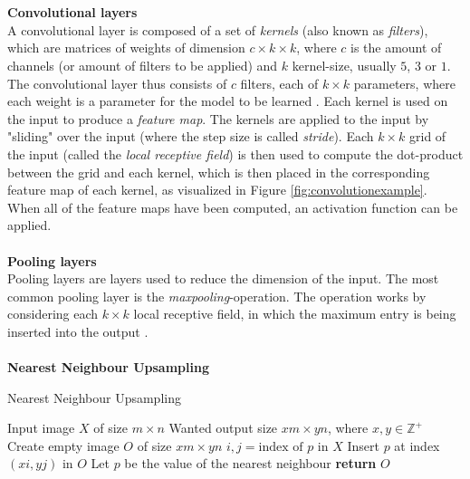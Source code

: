 \documentclass[./main.tex]{subfiles}
\begin{document}
\\
\\
\textbf{Convolutional layers} \\
A convolutional layer is composed of a set of \textit{kernels} (also known as \textit{filters}), which are matrices of weights of dimension $c \times k \times k$, where $c$ is the amount of channels (or amount of filters to be applied) and $k$ kernel-size, usually $5$, $3$ or $1$. The convolutional layer thus consists of $c$ filters, each of $k \times k$ parameters, where each weight is a parameter for the model to be learned \cite{Everything}. Each kernel is used on the input to produce a \textit{feature map}. The kernels are applied to the input by "sliding" over the input (where the step size is called \textit{stride}). Each $k \times k$ grid of the input (called the \textit{local receptive field}) is then used to compute the dot-product between the grid and each kernel, which is then placed in the corresponding feature map of each kernel, as visualized in Figure \ref{fig:convolutionexample}. When all of the feature maps have been computed, an activation function can be applied.
\\
\\
\textbf{Pooling layers}\\
Pooling layers are layers used to reduce the dimension of the input. The most common pooling layer is the \textit{maxpooling}-operation. The operation works by considering each $k \times k$ local receptive field, in which the maximum entry is being inserted into the output \cite{CNN}.
\\
\\
\noindent \textbf{Nearest Neighbour Upsampling}
\begin{algorithm}[htbp]
    \caption{Nearest Neighbour Upsampling \cite{NNUpsampling}}
    \label{Algorithm:NNUpsampling}
    \begin{algorithmic}[1]
        \Require Input image $X$ of size $m \times n$
        \Require Wanted output size $xm \times yn$, where $x, y \in \mathbb{Z}^{+}$
        \State Create empty image $O$ of size $xm \times yn$
            \State $i,j = \text{index of } p \text{ in } X$
            \State Insert $p$ at index $(xi, yj)$ in $O$
        \EndFor
            \State Let $p$ be the value of the nearest neighbour
        \EndFor
        \State \textbf{return} $O$
    \end{algorithmic}
\end{algorithm}
\newline
\end{document}
